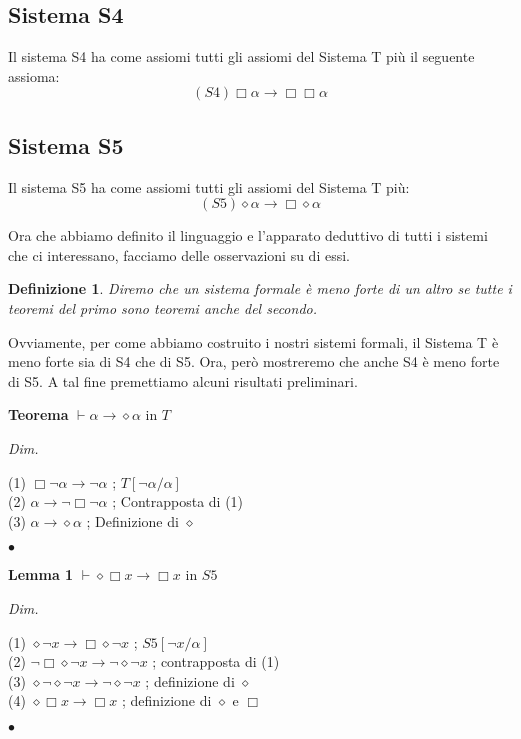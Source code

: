 \documentclass[a4paper, titlepage, 12pt]{report}
\newtheorem{definition}{Definizione}
\begin{document}
\subsection{Sistema S4}
Il sistema S4 ha come assiomi tutti gli assiomi del Sistema T più il seguente assioma:
$$(S4) \Box \alpha \rightarrow \Box \Box \alpha$$

\subsection{Sistema S5}
Il sistema S5 ha come assiomi tutti gli assiomi del Sistema T più:
$$(S5) \diamond \alpha \rightarrow \Box \diamond \alpha$$


Ora che abbiamo definito il linguaggio e l'apparato deduttivo di tutti i sistemi
che ci interessano, facciamo delle osservazioni su di essi.
\begin{definition}
Diremo che un sistema formale è meno forte di un altro se tutte i teoremi del primo
sono teoremi anche del secondo.
\end{definition}

Ovviamente, per come abbiamo costruito i nostri sistemi formali, il Sistema T è meno forte
sia di S4 che di S5.
Ora, però mostreremo che anche S4 è meno forte di S5. A tal fine premettiamo alcuni risultati
preliminari.

\begin{flushleft}
\textbf{Teorema}
$\vdash \alpha \rightarrow \diamond \alpha$ in $T$

\textit{Dim.}

(1) $\Box \neg \alpha \rightarrow \neg \alpha$ ; $T[\neg \alpha/\alpha]$ \\
(2) $\alpha \rightarrow \neg \Box \neg \alpha$ ; Contrapposta di (1) \\
(3) $\alpha \rightarrow \diamond \alpha$ ; Definizione di $\diamond$

\begin{flushright}
$\bullet$
\end{flushright}
\end{flushleft}

\begin{flushleft}
\textbf{Lemma 1}
$\vdash \diamond \Box x \rightarrow \Box x$ in $S5$

\textit{Dim.}

(1) $\diamond \neg x \rightarrow \Box \diamond \neg x$ ; $S5[\neg x/\alpha]$ \\
(2) $\neg \Box \diamond \neg x \rightarrow \neg \diamond \neg x$ ; contrapposta di (1) \\
(3) $\diamond \neg \diamond \neg x \rightarrow \neg \diamond \neg x$ ; definizione di $\diamond$ \\
(4) $\diamond \Box x \rightarrow \Box x$ ; definizione di $\diamond$ e $\Box$

\begin{flushright}
$\bullet$
\end{flushright}
\end{flushleft}
\end{document}
